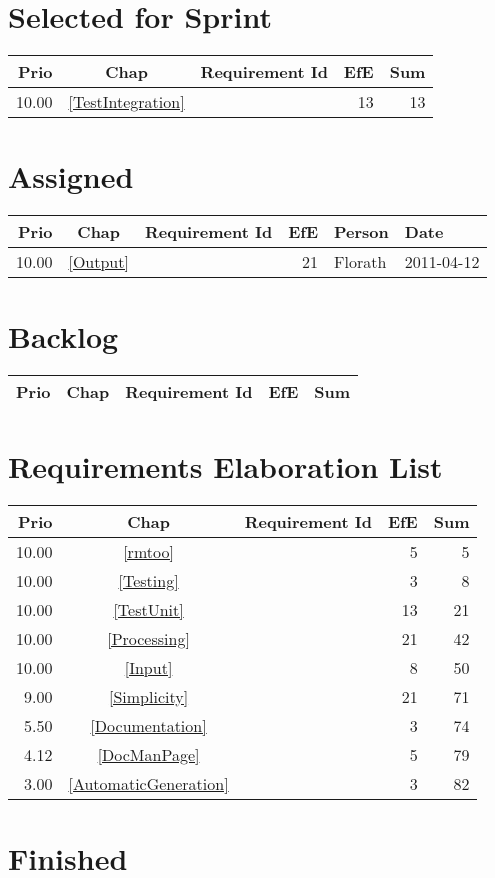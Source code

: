 \section{Selected for Sprint}
\begin{longtable}{|r|c|p{7cm}||r|r|} \hline
\textbf{Prio} & \textbf{Chap} & \textbf{Requirement Id} & \textbf{EfE} & \textbf{Sum} \\ \hline\endhead
10.00 & \ref{TestIntegration} & \nameref{TestIntegration} & 13 & 13 \\ \hline
\end{longtable}\section{Assigned}
\begin{longtable}{|r|c|p{6.5cm}||r|l|l|} \hline
\textbf{Prio} & \textbf{Chap} & \textbf{Requirement Id} & \textbf{EfE} & \textbf{Person} & \textbf{Date} \\ \hline\endhead
10.00 & \ref{Output} & \nameref{Output} & 21 & Florath & 2011-04-12 \\ \hline
\end{longtable}\section{Backlog}
\begin{longtable}{|r|c|p{7cm}||r|r|} \hline
\textbf{Prio} & \textbf{Chap} & \textbf{Requirement Id} & \textbf{EfE} & \textbf{Sum} \\ \hline\endhead
\end{longtable}\section{Requirements Elaboration List}
\begin{longtable}{|r|c|p{7cm}||r|r|} \hline
\textbf{Prio} & \textbf{Chap} & \textbf{Requirement Id} & \textbf{EfE} & \textbf{Sum} \\ \hline\endhead
10.00 & \ref{rmtoo} & \nameref{rmtoo} & 5 & 5 \\ \hline
10.00 & \ref{Testing} & \nameref{Testing} & 3 & 8 \\ \hline
10.00 & \ref{TestUnit} & \nameref{TestUnit} & 13 & 21 \\ \hline
10.00 & \ref{Processing} & \nameref{Processing} & 21 & 42 \\ \hline
10.00 & \ref{Input} & \nameref{Input} & 8 & 50 \\ \hline
9.00 & \ref{Simplicity} & \nameref{Simplicity} & 21 & 71 \\ \hline
5.50 & \ref{Documentation} & \nameref{Documentation} & 3 & 74 \\ \hline
4.12 & \ref{DocManPage} & \nameref{DocManPage} & 5 & 79 \\ \hline
3.00 & \ref{AutomaticGeneration} & \nameref{AutomaticGeneration} & 3 & 82 \\ \hline
\end{longtable}\section{Finished}
